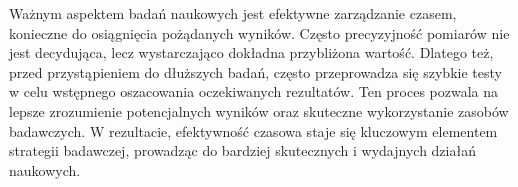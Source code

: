 Ważnym aspektem badań naukowych jest efektywne zarządzanie czasem, konieczne do osiągnięcia pożądanych wyników.
Często precyzyjność pomiarów nie jest decydująca, lecz wystarczająco dokładna przybliżona wartość.
Dlatego też, przed przystąpieniem do dłuższych badań, często przeprowadza się szybkie testy w celu wstępnego oszacowania oczekiwanych rezultatów.
Ten proces pozwala na lepsze zrozumienie potencjalnych wyników oraz skuteczne wykorzystanie zasobów badawczych.
W rezultacie, efektywność czasowa staje się kluczowym elementem strategii badawczej, prowadząc do bardziej skutecznych i wydajnych działań naukowych.